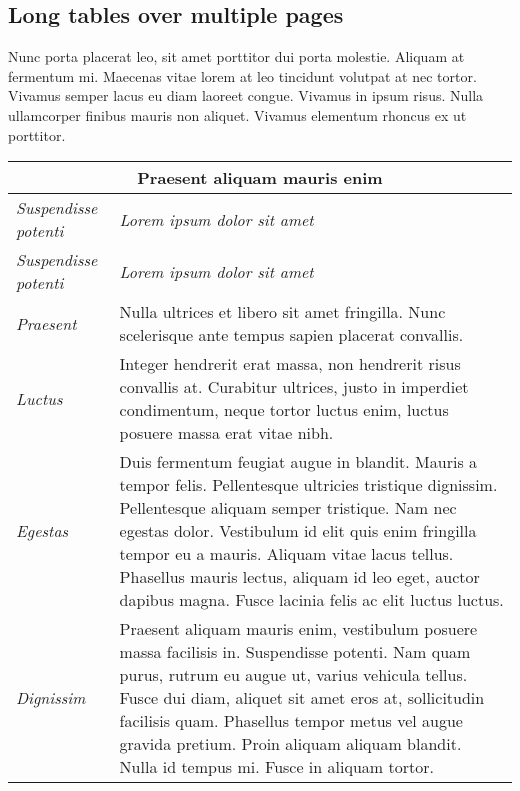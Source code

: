 \subsection{Long tables over multiple pages}

Nunc porta placerat leo, sit amet porttitor dui porta molestie. Aliquam at fermentum mi. Maecenas vitae lorem at leo tincidunt volutpat at nec tortor. Vivamus semper lacus eu diam laoreet congue. Vivamus in ipsum risus. Nulla ullamcorper finibus mauris non aliquet. Vivamus elementum rhoncus ex ut porttitor.

\begin{center}
	\begin{longtable}{ | p{} | p{} | }
		
		\hline
		\multicolumn{2}{|c|}{\textbf{Praesent aliquam mauris enim}}
		\\ \hline
		
		\emph{Suspendisse potenti} & \emph{Lorem ipsum dolor sit amet}
		\\ \hline \hline
		\endfirsthead %
		
		\hline
		\emph{Suspendisse potenti} & \emph{Lorem ipsum dolor sit amet}
		\\ \hline \hline
		\endhead %
		
		\hline
		\endfoot %
		
		\endlastfoot %
		
		\emph{Praesent}
		& Nulla ultrices et libero sit amet fringilla. Nunc scelerisque ante tempus sapien placerat convallis.
		\\ \hline
		
		\emph{Luctus}
		& Integer hendrerit erat massa, non hendrerit risus convallis at. Curabitur ultrices, justo in imperdiet condimentum, neque tortor luctus enim, luctus posuere massa erat vitae nibh.
		\\ \hline
		
		\emph{Egestas}
		& Duis fermentum feugiat augue in blandit. Mauris a tempor felis. Pellentesque ultricies tristique dignissim. Pellentesque aliquam semper tristique. Nam nec egestas dolor. Vestibulum id elit quis enim fringilla tempor eu a mauris. Aliquam vitae lacus tellus. Phasellus mauris lectus, aliquam id leo eget, auctor dapibus magna. Fusce lacinia felis ac elit luctus luctus.
		\\ \hline
		
		\emph{Dignissim}
		& Praesent aliquam mauris enim, vestibulum posuere massa facilisis in. Suspendisse potenti. Nam quam purus, rutrum eu augue ut, varius vehicula tellus. Fusce dui diam, aliquet sit amet eros at, sollicitudin facilisis quam. Phasellus tempor metus vel augue gravida pretium. Proin aliquam aliquam blandit. Nulla id tempus mi. Fusce in aliquam tortor.
		\\ \hline
		

\end{longtable}
\end{center}
